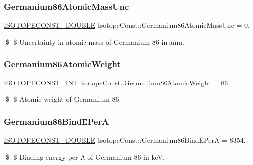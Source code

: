 \subsubsection{\texorpdfstring{Germanium86\+Atomic\+Mass\+Unc}{Germanium86AtomicMassUnc}}
{\footnotesize\ttfamily \mbox{\hyperlink{group___isotope_const-_macros_ga8f45a7272ce02c0b4c65c44636ed719a}{I\+S\+O\+T\+O\+P\+E\+C\+O\+N\+S\+T\+\_\+\+D\+O\+U\+B\+LE}} Isotope\+Const\+::\+Germanium86\+Atomic\+Mass\+Unc = 0.}

\$ \$ Uncertainty in atomic mass of Germanium-\/86 in amu. \mbox{\label{group___isotope_const-_germanium-_ge86_ga7309a500a4c5a227be2d883dcd72f460}} 
\subsubsection{\texorpdfstring{Germanium86\+Atomic\+Weight}{Germanium86AtomicWeight}}
{\footnotesize\ttfamily \mbox{\hyperlink{group___isotope_const-_macros_ga5f18360b3e99483a35c32d789e62621c}{I\+S\+O\+T\+O\+P\+E\+C\+O\+N\+S\+T\+\_\+\+I\+NT}} Isotope\+Const\+::\+Germanium86\+Atomic\+Weight = 86}

\$ \$ Atomic weight of Germanium-\/86. \mbox{\label{group___isotope_const-_germanium-_ge86_gabc980182c41f2ac0bcf50b2ebfe63d94}} 
\subsubsection{\texorpdfstring{Germanium86\+Bind\+E\+PerA}{Germanium86BindEPerA}}
{\footnotesize\ttfamily \mbox{\hyperlink{group___isotope_const-_macros_ga8f45a7272ce02c0b4c65c44636ed719a}{I\+S\+O\+T\+O\+P\+E\+C\+O\+N\+S\+T\+\_\+\+D\+O\+U\+B\+LE}} Isotope\+Const\+::\+Germanium86\+Bind\+E\+PerA = 8354.}

\$ \$ Binding energy per A of Germanium-\/86 in keV. \mbox{\label{group___isotope_const-_germanium-_ge86_ga16889bdb1eb63df9af2854cd5611d4b5}} 
